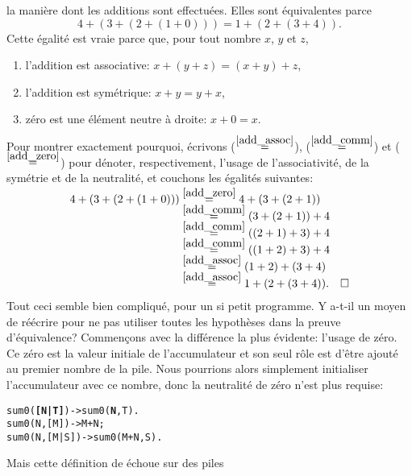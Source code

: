 la manière dont les additions sont effectuées. Elles sont équivalentes
parce
\begin{equation*}
4 + (3 + (2 + (1 + 0))) = 1 + (2 + (3 + 4)).
\end{equation*}
Cette égalité est vraie parce que, pour tout nombre \(x\), \(y\) et
\(z\),\label{proof_sum}
\begin{enumerate}

  \item \label{add_assoc} l'addition est associative: \(x + (y + z) =
    (x + y) + z\),

  \item \label{add_comm} l'addition est symétrique: \(x + y = y +
    x\),

  \item \label{add_zero} zéro est une élément neutre à droite: \(x+0 =
    x\).

\end{enumerate}
Pour montrer exactement pourquoi, écrivons
(\(\mathrel{\stackrel{\smash{\ref{add_assoc}}}{=}}\)), (\(\mathrel{\stackrel{\smash{\ref{add_comm}}}{=}}\)) et
(\(\mathrel{\stackrel{\smash{\ref{add_zero}}}{=}}\)) pour dénoter, respectivement, l'usage de
l'associativité, de la symétrie et de la neutralité, et couchons les
égalités suivantes:
\begin{align*}
4 + (3 + (2 + (1 + 0)))
  &\mathrel{\stackrel{\smash{\smash{\ref{add_zero}}}}{=}}  4 + (3 + (2 + 1))\\
  &\mathrel{\stackrel{\smash{\smash{\ref{add_comm}}}}{=}}  (3 + (2 + 1)) + 4\\
  &\mathrel{\stackrel{\smash{\smash{\ref{add_comm}}}}{=}}  ((2 + 1) + 3) + 4\\
  &\mathrel{\stackrel{\smash{\smash{\ref{add_comm}}}}{=}}  ((1 + 2) + 3) + 4\\
  &\mathrel{\stackrel{\smash{\smash{\ref{add_assoc}}}}{=}} (1 + 2) + (3 + 4)\\
  &\mathrel{\stackrel{\smash{\smash{\ref{add_assoc}}}}{=}} 1 + (2 + (3 + 4)).\quad\Box 
\end{align*}
Tout ceci semble bien compliqué, pour un si petit programme. Y a-t-il
un moyen de réécrire  pour ne pas utiliser toutes les
hypothèses dans la preuve d'équivalence? Commençons avec la différence
la plus évidente: l'usage de zéro. Ce zéro est la valeur initiale de
l'accumulateur et son seul rôle est d'être ajouté au premier nombre de
la pile. Nous pourrions alors simplement initialiser l'accumulateur
avec ce nombre, donc la neutralité de zéro n'est plus requise:
\begin{alltt}
sum0(\textbf{[N|T]})   -> sum0(\textbf{N},T).
sum0(N,[M])   -> M+N;
sum0(N,[M|S]) -> sum0(M+N,S).
\end{alltt}
Mais cette définition de  échoue sur des piles
